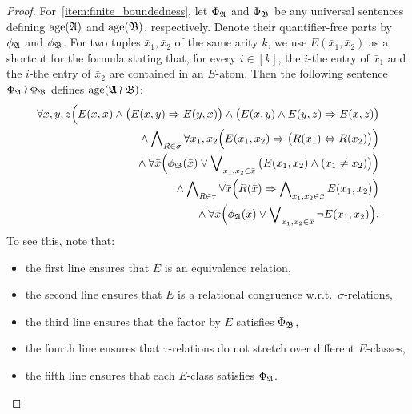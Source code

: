 \begin{proof}
For~\eqref{item:finite_boundedness}, let $\Phi_{\mathfrak{A}}$ and $\Phi_{\mathfrak{B}}$ be any universal sentences defining $\mathrm{age}(\mathfrak{A})$ and $\mathrm{age}(\mathfrak{B})$, respectively. 
%
Denote their quantifier-free parts by $\phi_{\mathfrak{A}}$ and $\phi_{\mathfrak{B}}$.
%
For two tuples $\bar{x}_1,\bar{x}_2$ of the same arity $k$, we use $E(\bar{x}_1,\bar{x}_2)$ as a shortcut for the formula stating that, for every $i\in [k]$, the $i$-the entry of $\bar{x}_1$ and the $i$-the entry of $\bar{x}_2$ are contained in an $E$-atom.
%
Then the following sentence $\Phi_{\mathfrak{A}} \wr \Phi_{\mathfrak{B}}$ defines $\mathrm{age}(\mathfrak{A}\wr\mathfrak{B})$:
%
\begin{align*}
 \forall x,y,z  \Big( E(x,x) \wedge  \big(E(x,y) \Rightarrow E(y,x)\big) \wedge  \big(E(x,y) \wedge E(y,z) \Rightarrow E(x,z) \big)
 \\   
  {}  \wedge \bigwedge\nolimits_{R\in \sigma}   \forall \bar{x}_1,\bar{x}_2   \Big( E(\bar{x}_1,\bar{x}_2) \Rightarrow \big(R(\bar{x}_1)  \Leftrightarrow  R(\bar{x}_2)  \big) 
 \Big)  \\  
   {}  \wedge  \forall \bar{x}  \Big(   \phi_{\mathfrak{B}}(\bar{x})\vee \bigvee\nolimits_{x_1,x_2\in \bar{x}} \big(E(x_1,x_2) \wedge (x_1\neq x_2)\big)    \Big) \\
   {} \wedge \bigwedge\nolimits_{R\in \tau} \forall \bar{x} \Big( R(\bar{x}) \Rightarrow \bigwedge\nolimits_{x_1,x_2\in \bar{x}} E(x_1,x_2)\Big) \\
{}  \wedge \forall \bar{x}  \Big(   \phi_{\mathfrak{A}}(\bar{x})\vee \bigvee\nolimits_{x_1,x_2\in \bar{x}} \neg E(x_1,x_2) \Big).  
\end{align*}
%
To see this, note that:
%
\begin{itemize}
    \item the first line ensures that $E$ is an equivalence relation,
    \item the second line ensures that $E$ is a relational congruence w.r.t.\ $\sigma$-relations,
    \item the third line ensures that the factor by $E$ satisfies $\Phi_{\mathfrak{B}}$, 
    \item the fourth line ensures that $\tau$-relations do not stretch over different $E$-classes,
    \item the fifth line ensures that each $E$-class satisfies $\Phi_{\mathfrak{A}}$.
\end{itemize}


\end{proof}
